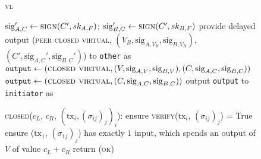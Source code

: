 \begin{figure}[H]
\begin{systembox}{\textsc{vl}}
\begin{algorithmic}[1]
              \State $\mathrm{sig}_{A, C}' \gets \textsc{sign}(C', sk_{A, F})$;
              $\mathrm{sig}_{B, C}' \gets \textsc{sign}(C', sk_{B, F})$
            \EndIf
            \State provide delayed output (\textsc{peer closed virtual}, $(V_B,
            \mathrm{sig}_{A, V_B}, \mathrm{sig}_{B, V_B})$, $(C',
            \mathrm{sig}_{A, C}', \mathrm{sig}_{B, C}')$) to \texttt{other} as
            \bob
          \EndIf
            \State $\mathtt{output} \gets (\textsc{closed virtual}, (V,
            \mathrm{sig}_{A, V}, \mathrm{sig}_{B, V}), (C, \mathrm{sig}_{A, C},
            \mathrm{sig}_{B, C}))$
          \Else
            \State $\mathtt{output} \gets (\textsc{closed virtual}, (C,
            \mathrm{sig}_{A, C}, \mathrm{sig}_{B, C}))$
          \EndIf
          \State output \texttt{output} to \texttt{initiator} as \alice
        \EndIf
        \Statex

        \textsc{closed}($c_L$, $c_R$, $(\mathrm{tx}_i, (\sigma_{ij})_j)_i$):
        \Indent
            \State ensure \textsc{verify}($\mathrm{tx}_i$, $(\sigma_{ij})_j$) =
            True
          \EndFor
          \State ensure ($\mathrm{tx}_1$, $(\sigma_{1j})_j$) has exactly $1$
          input, which spends an output of $V$ of value $c_L + c_R$
          \State return (\textsc{ok})
        \EndIndent
    \end{algorithmic}
  \end{systembox}
  \caption{}
  \label{code:virtual-layer}
\end{figure}
